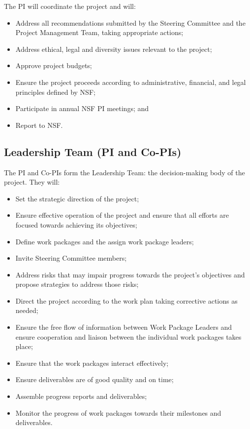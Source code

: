 \documentclass[
]{book}
\providecommand{\tightlist}{%
  \setlength{\itemsep}{0pt}\setlength{\parskip}{0pt}}
\begin{document}
The PI will coordinate the project and will:

\begin{itemize}
\tightlist
\item
  Address all recommendations submitted by the Steering Committee and the Project Management Team, taking appropriate actions;
\item
  Address ethical, legal and diversity issues relevant to the project;
\item
  Approve project budgets;
\item
  Ensure the project proceeds according to administrative, financial, and legal principles defined by NSF;
\item
  Participate in annual NSF PI meetings; and
\item
  Report to NSF.
\end{itemize}

\hypertarget{leadership-team-pi-and-co-pis}{%
\subsection{Leadership Team (PI and Co-PIs)}\label{leadership-team-pi-and-co-pis}}

The PI and Co-PIs form the Leadership Team: the decision-making body of the project. They will:

\begin{itemize}
\tightlist
\item
  Set the strategic direction of the project;
\item
  Ensure effective operation of the project and ensure that all efforts are focused towards achieving its objectives;
\item
  Define work packages and the assign work package leaders;
\item
  Invite Steering Committee members;
\item
  Address risks that may impair progress towards the project's objectives and propose strategies to address those risks;
\item
  Direct the project according to the work plan taking corrective actions as needed;
\item
  Ensure the free flow of information between Work Package Leaders and ensure cooperation and liaison between
  the individual work packages takes place;
\item
  Ensure that the work packages interact effectively;
\item
  Ensure deliverables are of good quality and on time;
\item
  Assemble progress reports and deliverables;
\item
  Monitor the progress of work packages towards their milestones and deliverables.
\end{itemize}
\end{document}
